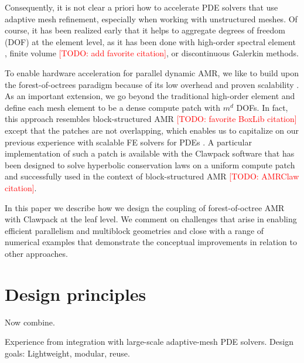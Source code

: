 \documentclass{IOS-Book-Article}     %
\newcommand{\todo}[1]{\textcolor{red}{[TODO: #1]}\xspace}
\begin{document}
Consequently, it is not clear a priori how to accelerate PDE solvers that use
adaptive mesh refinement, especially when working with unstructured meshes.  Of
course, it has been realized early that it helps to aggregate degrees of
freedom (DOF) at the element level, as it has been done with high-order
spectral element \cite{TufoFischer99}, finite volume
\todo{add favorite citation}, or discontinuous Galerkin
\cite{BursteddeGhattasGurnisEtAl10} methods.
%

To enable hardware acceleration for parallel dynamic AMR, we like to build upon
the forest-of-octrees paradigm because of its low overhead and proven
scalability \cite{BursteddeWilcoxGhattas11}.  As an important extension, we go
beyond the traditional high-order element and define each mesh element to be a
dense compute patch with $m^d$ DOFs.  In fact, this approach resembles
block-structured AMR \cite{ColellaGravesKeenEtAl07}
\todo{favorite BoxLib citation}
except that the patches are not overlapping, which enables us to capitalize on
our previous experience with scalable FE solvers for PDEs
\cite{BursteddeStadlerAlisicEtAl13}.  A particular implementation of such a
patch is available with the Clawpack software \cite{LeVeque97} that has been
designed to solve hyperbolic conservation laws on a uniform compute patch and
successfully used in the context of block-structured AMR \todo{AMRClaw
citation}.

In this paper we describe how we design the coupling of forest-of-octree AMR
with Clawpack at the leaf level.  We comment on challenges that arise in
enabling efficient parallelism and multiblock geometries and close with a range
of numerical examples that demonstrate the conceptual improvements in relation
to other approaches.

\section*{Design principles}



Now combine.



Experience from integration with large-scale adaptive-mesh PDE solvers.
Design goals: Lightweight, modular, reuse.
\end{document}

